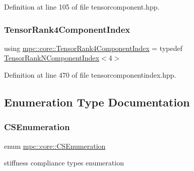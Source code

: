 Definition at line 105 of file tensorcomponent.\+hpp.

\mbox{\label{namespacempc_1_1core_a54c081f41b2475abd10182bf023805d2}} 
\subsubsection{\texorpdfstring{Tensor\+Rank4\+Component\+Index}{TensorRank4ComponentIndex}}
{\footnotesize\ttfamily using \mbox{\hyperlink{namespacempc_1_1core_a54c081f41b2475abd10182bf023805d2}{mpc\+::core\+::\+Tensor\+Rank4\+Component\+Index}} = typedef \mbox{\hyperlink{classmpc_1_1core_1_1_tensor_rank_n_component_index}{Tensor\+Rank\+N\+Component\+Index}}$<$4$>$}



Definition at line 470 of file tensorcomponentindex.\+hpp.



\subsection{Enumeration Type Documentation}
\mbox{\label{namespacempc_1_1core_ad3e8e7d43bfc9202d954d999f7d5c991}} 
\subsubsection{\texorpdfstring{C\+S\+Enumeration}{CSEnumeration}}
{\footnotesize\ttfamily enum \mbox{\hyperlink{namespacempc_1_1core_ad3e8e7d43bfc9202d954d999f7d5c991}{mpc\+::core\+::\+C\+S\+Enumeration}}\hspace{0.3cm}{\ttfamily [strong]}}



stiffness compliance types enumeration 

